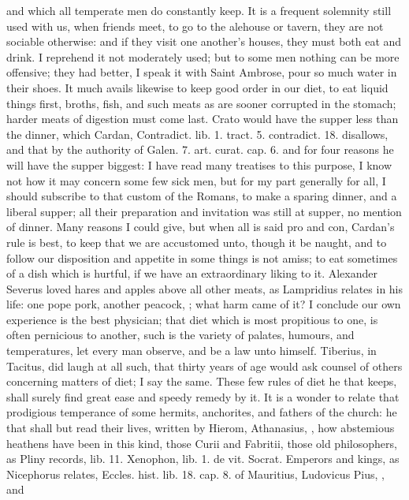 {and which all temperate men do constantly keep. It is a frequent
solemnity still used with us, when friends meet, to go to the alehouse
or tavern, they are not sociable otherwise: and if they visit one
another's houses, they must both eat and drink. I reprehend it not
moderately used; but to some men nothing can be more offensive; they
had better, I speak it with Saint Ambrose, pour so much water in
their shoes.
It much avails likewise to keep good order in our diet, to eat
liquid things first, broths, fish, and such meats as are sooner
corrupted in the stomach; harder meats of digestion must come last.
Crato would have the supper less than the dinner, which Cardan,
Contradict. lib. 1. tract. 5. contradict. 18. disallows, and that by
the authority of Galen. 7. art. curat. cap. 6. and for four reasons he
will have the supper biggest: I have read many treatises to this
purpose, I know not how it may concern some few sick men, but for my
part generally for all, I should subscribe to that custom of the
Romans, to make a sparing dinner, and a liberal supper; all their
preparation and invitation was still at supper, no mention of dinner.
Many reasons I could give, but when all is said pro and con,
Cardan's rule is best, to keep that we are accustomed unto,
though it be naught, and to follow our disposition and appetite in some
things is not amiss; to eat sometimes of a dish which is hurtful, if we
have an extraordinary liking to it. Alexander Severus loved hares and
apples above all other meats, as Lampridius relates in his life:
one pope pork, another peacock, \etc{}; what harm came of it? I conclude
our own experience is the best physician; that diet which is most
propitious to one, is often pernicious to another, such is the variety
of palates, humours, and temperatures, let every man observe, and be a
law unto himself. Tiberius, in Tacitus, did laugh at all such,
that thirty years of age would ask counsel of others concerning matters
of diet; I say the same.
These few rules of diet he that keeps, shall surely find great ease and
speedy remedy by it. It is a wonder to relate that prodigious
temperance of some hermits, anchorites, and fathers of the church: he
that shall but read their lives, written by Hierom, Athanasius, \etc{},
how abstemious heathens have been in this kind, those Curii and
Fabritii, those old philosophers, as Pliny records, lib. 11. Xenophon,
lib. 1. de vit. Socrat. Emperors and kings, as Nicephorus relates,
Eccles. hist. lib. 18. cap. 8. of Mauritius, Ludovicus Pius, \etc{}, and
}
